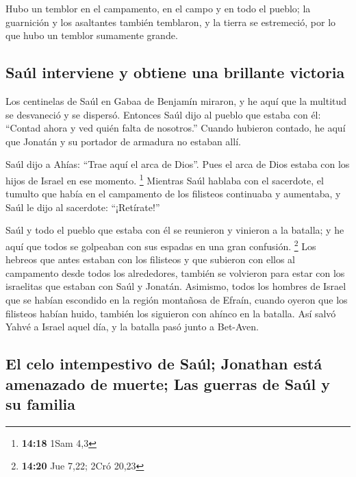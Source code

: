  Hubo un temblor en el campamento, en el campo y en todo
el pueblo; la guarnición y los asaltantes también temblaron, y la tierra
se estremeció, por lo que hubo un temblor sumamente grande.

\hypertarget{sauxfal-interviene-y-obtiene-una-brillante-victoria}{%
\subsection{Saúl interviene y obtiene una brillante
victoria}\label{sauxfal-interviene-y-obtiene-una-brillante-victoria}}

 Los centinelas de Saúl en Gabaa de Benjamín miraron, y
he aquí que la multitud se desvaneció y se dispersó. 
Entonces Saúl dijo al pueblo que estaba con él: ``Contad ahora y ved
quién falta de nosotros.'' Cuando hubieron contado, he aquí que Jonatán
y su portador de armadura no estaban allí.

 Saúl dijo a Ahías: ``Trae aquí el arca de Dios''. Pues
el arca de Dios estaba con los hijos de Israel en ese momento.
\footnote{\textbf{14:18} 1Sam 4,3}  Mientras Saúl hablaba
con el sacerdote, el tumulto que había en el campamento de los filisteos
continuaba y aumentaba, y Saúl le dijo al sacerdote: ``¡Retírate!''

 Saúl y todo el pueblo que estaba con él se reunieron y
vinieron a la batalla; y he aquí que todos se golpeaban con sus espadas
en una gran confusión. \footnote{\textbf{14:20} Jue 7,22; 2Cró 20,23}
 Los hebreos que antes estaban con los filisteos y que
subieron con ellos al campamento desde todos los alrededores, también se
volvieron para estar con los israelitas que estaban con Saúl y Jonatán.
 Asimismo, todos los hombres de Israel que se habían
escondido en la región montañosa de Efraín, cuando oyeron que los
filisteos habían huido, también los siguieron con ahínco en la batalla.
 Así salvó Yahvé a Israel aquel día, y la batalla pasó
junto a Bet-Aven.

\hypertarget{el-celo-intempestivo-de-sauxfal-jonathan-estuxe1-amenazado-de-muerte-las-guerras-de-sauxfal-y-su-familia}{%
\subsection{El celo intempestivo de Saúl; Jonathan está amenazado de
muerte; Las guerras de Saúl y su
familia}\label{el-celo-intempestivo-de-sauxfal-jonathan-estuxe1-amenazado-de-muerte-las-guerras-de-sauxfal-y-su-familia}}

